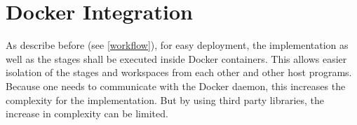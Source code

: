 \section{Docker Integration}

As describe before (see \autoref{workflow}), for easy deployment, the implementation as well as the stages shall be executed inside Docker\cite{docker:main} containers.
This allows easier isolation of the stages and workspaces from each other and other host programs.
Because one needs to communicate with the Docker daemon, this increases the complexity for the implementation.
But by using third party libraries, the increase in complexity can be limited.




